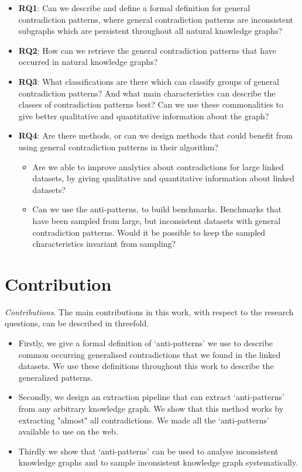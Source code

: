 \documentclass[11pt,letterpaper ,oneside ]{book}
\begin{document}
	\begin{itemize}
		\item \textbf{RQ1}: Can we describe and define a formal definition for general contradiction patterns, where general contradiction patterns are inconsistent subgraphs which are persistent throughout all natural knowledge graphs?
		\item \textbf{RQ2}: How can we retrieve the general contradiction patterns that have occurred in natural knowledge graphs? 
		\item \textbf{RQ3}: What classifications are there which can classify groups of general contradiction patterns? And what main characteristics can describe the classes of contradiction patterns best? Can we use these commonalities to give better qualitative and quantitative information about the graph?
		\item \textbf{RQ4}: Are there methods, or can we design methods that could benefit from using general contradiction patterns in their algorithm? 
		\begin{itemize}
			\item Are we able to improve analytics about contradictions for large linked datasets, by giving qualitative and quantitative information about linked datasets?
			\item Can we use the anti-patterns, to build benchmarks. Benchmarks that have been sampled from large, but inconsistent datasets with general contradiction patterns. Would it be possible to keep the sampled characteristics invariant from sampling?
		\end{itemize}
	\end{itemize}
	
	\section{Contribution}
	\textit{Contributions}. 
	The main contributions in this work, with respect to the research questions, can be described in threefold.
	\begin{itemize}
		\item Firstly, we give a formal definition of `anti-patterns' we use to describe common occurring generalised contradictions that we found in the linked datasets. We use these definitions throughout this work to describe the generalized patterns.
		\item Secondly, we design an extraction pipeline that can extract `anti-patterns' from any arbitrary knowledge graph. We show that this method works by extracting "almost" all contradictions. We made all the `anti-patterns' available to use on the web.
		\item Thirdly we show that `anti-patterns' can be used to analyse inconsistent knowledge graphs and to sample inconsistent knowledge graph systematically.
	\end{itemize}
	
\end{document}
